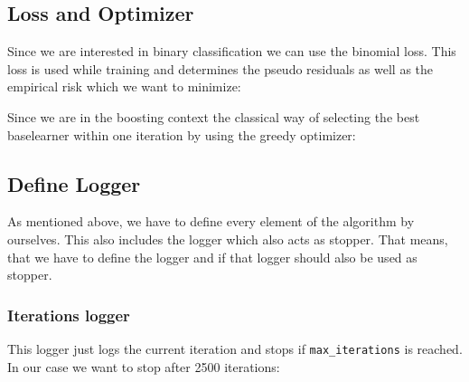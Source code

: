 \documentclass[]{article}
\newenvironment{Shaded}{\begin{snugshade}}{\end{snugshade}}
\newcommand{\KeywordTok}[1]{\textcolor[rgb]{0.13,0.29,0.53}{\textbf{#1}}}
\newcommand{\StringTok}[1]{\textcolor[rgb]{0.31,0.60,0.02}{#1}}
\newcommand{\OperatorTok}[1]{\textcolor[rgb]{0.81,0.36,0.00}{\textbf{#1}}}
\newcommand{\NormalTok}[1]{#1}
\begin{document}
\subsection{Loss and Optimizer}\label{loss-and-optimizer}

Since we are interested in binary classification we can use the binomial
loss. This loss is used while training and determines the pseudo
residuals as well as the empirical risk which we want to minimize:

\begin{Shaded}
\end{Shaded}

Since we are in the boosting context the classical way of selecting the
best baselearner within one iteration by using the greedy optimizer:

\begin{Shaded}
\end{Shaded}

\subsection{Define Logger}\label{define-logger}

As mentioned above, we have to define every element of the algorithm by
ourselves. This also includes the logger which also acts as stopper.
That means, that we have to define the logger and if that logger should
also be used as stopper.

\subsubsection{Iterations logger}\label{iterations-logger}

This logger just logs the current iteration and stops if
\texttt{max\_iterations} is reached. In our case we want to stop after
2500 iterations:
\end{document}
